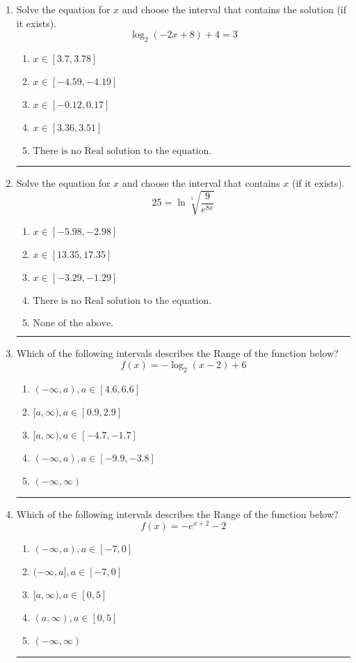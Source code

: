 \documentclass[14pt]{extbook}
\newcommand{\litem}[1]{\item#1\hspace*{-1cm}\rule{\textwidth}{0.4pt}}
\begin{document}
\begin{enumerate}
\litem{
Solve the equation for $x$ and choose the interval that contains the solution (if it exists).\[ \log_{2}{(-2x+8)}+4 = 3 \]\begin{enumerate}[label=\Alph*.]
\item \( x \in [3.7, 3.78] \)
\item \( x \in [-4.59, -4.19] \)
\item \( x \in [-0.12, 0.17] \)
\item \( x \in [3.36, 3.51] \)
\item \( \text{There is no Real solution to the equation.} \)

\end{enumerate} }
\litem{
 Solve the equation for $x$ and choose the interval that contains $x$ (if it exists).\[  25 = \ln{\sqrt[5]{\frac{9}{e^{8x}}}} \]\begin{enumerate}[label=\Alph*.]
\item \( x \in [-5.98, -2.98] \)
\item \( x \in [13.35, 17.35] \)
\item \( x \in [-3.29, -1.29] \)
\item \( \text{There is no Real solution to the equation.} \)
\item \( \text{None of the above.} \)

\end{enumerate} }
\litem{
Which of the following intervals describes the Range of the function below?\[ f(x) = -\log_2{(x-2)}+6 \]\begin{enumerate}[label=\Alph*.]
\item \( (-\infty, a), a \in [4.6, 6.6] \)
\item \( [a, \infty), a \in [0.9, 2.9] \)
\item \( [a, \infty), a \in [-4.7, -1.7] \)
\item \( (-\infty, a), a \in [-9.9, -3.8] \)
\item \( (-\infty, \infty) \)

\end{enumerate} }
\litem{
Which of the following intervals describes the Range of the function below?\[ f(x) = -e^{x+2}-2 \]\begin{enumerate}[label=\Alph*.]
\item \( (-\infty, a), a \in [-7, 0] \)
\item \( (-\infty, a], a \in [-7, 0] \)
\item \( [a, \infty), a \in [0, 5] \)
\item \( (a, \infty), a \in [0, 5] \)
\item \( (-\infty, \infty) \)


\end{enumerate}}
\end{enumerate}
\end{document}
